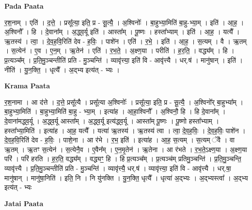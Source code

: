 \documentclass[17pt]{extarticle}
\begin{document}
\textbf{Pada Paata} \newline

र॒श॒नाम् । एति॑ । द॒त्ते॒ । प्रसू᳚त्या॒ इति॒ प्र - सू॒त्यै॒ । अ॒श्विनोः᳚ । बा॒हुभ्या॒मिति॑ बा॒हु-भ्या॒म् । इति॑ । आ॒ह॒ । अ॒श्विनौ᳚ । हि । दे॒वाना᳚म् । अ॒द्ध्व॒र्यू इति॑ । आस्ता᳚म् । पू॒ष्णः । हस्ता᳚भ्याम् । इति॑ । आ॒ह॒ । यत्यै᳚ । ऋ॒तस्य॑ । त्वा॒ । दे॒व॒ह॒वि॒रिति॑ देव - ह॒विः॒ । पाशे॑न । एति॑ । र॒भे॒ । इति॑ । आ॒ह॒ । स॒त्यम् । वै । ऋ॒तम् । स॒त्येन॑ । ए॒व । ए॒न॒म् । ऋ॒तेन॑ । एति॑ । र॒भ॒ते॒ । अ॒क्ष्ण॒या । परीति॑ । ह॒र॒ति॒ । वद्ध्य᳚म् । हि । प्र॒त्यञ्च᳚म् । प्र॒ति॒मु॒ञ्चन्तीति॑ प्रति - मु॒ञ्चन्ति॑ । व्यावृ॑त्त्या॒ इति॑ वि - आवृ॑त्त्यै । धर्.ष॑ । मानु॑षान् । इति॑ । नीति॑ । यु॒न॒क्ति॒ । धृत्यै᳚ । अ॒द्भ्य इत्य॑त् - भ्यः ।  \newline


\textbf{Krama Paata} \newline

र॒श॒नामा । आ द॑त्ते । द॒त्ते॒ प्रसू᳚त्यै । प्रसू᳚त्या अ॒श्विनोः᳚ । प्रसू᳚त्या॒ इति॒ प्र - सू॒त्यै॒ । अ॒श्विनो᳚र् बा॒हुभ्या᳚म् । बा॒हुभ्या॒मिति॑ । बा॒हुभ्या॒मिति॑ बा॒हु - भ्या॒म् । इत्या॑ह । आ॒हा॒श्विनौ᳚ । अ॒श्विनौ॒ हि । हि दे॒वाना᳚म् । दे॒वाना॑मद्ध्व॒र्यू । अ॒द्ध्व॒र्यू आस्ता᳚म् । अ॒द्ध्व॒र्यू इत्य॑द्ध्व॒र्यू । आस्ता᳚म् पू॒ष्णः । पू॒ष्णो हस्ता᳚भ्याम् । हस्ता᳚भ्या॒मिति॑ । इत्या॑ह । आ॒ह॒ यत्यै᳚ । यत्या॑ ऋ॒तस्य॑ । ऋ॒तस्य॑ त्वा । त्वा॒ दे॒व॒ह॒विः॒ । दे॒व॒ह॒विः॒ पाशे॑न । दे॒व॒ह॒वि॒रिति॑ देव - ह॒विः॒ । पाशे॒ना । आ र॑भे । र॒भ॒ इति॑ । इत्या॑ह । आ॒ह॒ स॒त्यम् । स॒त्यम् ॅवै । वा ऋ॒तम् । ऋ॒तꣳ स॒त्येन॑ । स॒त्येनै॒व । ए॒वैन᳚म् । ए॒न॒मृ॒तेन॑ । ऋ॒तेना । आ र॑भते । र॒भ॒ते॒ऽक्ष्ण॒या । अ॒क्ष्ण॒या परि॑ । परि॑ हरति । ह॒र॒ति॒ वद्ध्य᳚म् । वद्ध्यꣳ॒॒ हि । हि प्र॒त्यञ्च᳚म् । प्र॒त्यञ्च॑म् प्रतिमु॒ञ्चन्ति॑ । प्र॒ति॒मु॒ञ्चन्ति॒ व्यावृ॑त्त्यै । प्र॒ति॒मु॒ञ्चन्तीति॑ प्रति - मु॒ञ्चन्ति॑ । व्यावृ॑त्त्यै॒ धर्.ष॑ । व्यावृ॑त्त्या॒ इति॑ वि - आवृ॑त्त्यै । धर्.षा॒ मानु॑षान् । मानु॑षा॒निति॑ । इति॒ नि । नि यु॑नक्ति । यु॒न॒क्ति॒ धृत्यै᳚ । धृत्या॑ अ॒द्भ्यः । अ॒द्भ्यस्त्वा᳚ । अ॒द्‍भ्य इत्य॑त् - भ्यः \newline

\textbf{Jatai Paata} \newline
\end{document}
